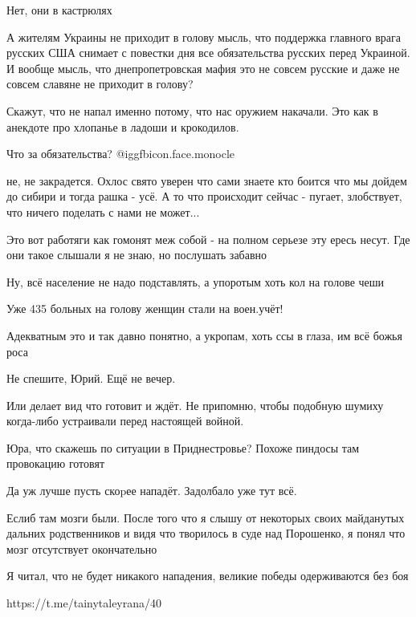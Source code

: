 \begin{multicols}{2}
Нет, они в кастрюлях


А жителям Украины не приходит в голову мысль, что поддержка главного врага
русских США снимает с повестки дня все обязательства русских перед Украиной. И
вообще мысль, что днепропетровская мафия это не совсем русские и даже не совсем
славяне не приходит в голову?


Скажут, что не напал именно потому, что нас оружием накачали. Это как в
анекдоте про хлопанье в ладоши и крокодилов.


Что за обязательства?  @igg{fbicon.face.monocle} 


не, не закрадется. Охлос свято уверен что сами знаете кто боится что мы дойдем
до сибири и тогда рашка - усё. А то что происходит сейчас - пугает, злобствует,
что ничего поделать с нами не может... 

Это вот работяги как гомонят меж собой - на полном серьезе эту ересь несут. Где
они такое слышали я не знаю, но послушать забавно


Ну, всё население не надо подставлять, а упоротым хоть кол на голове чеши


Уже 435 больных на голову женщин стали на воен.учёт!


Адекватным это и так давно понятно, а укропам, хоть ссы в глаза, им всё божья роса


Не спешите, Юрий. Ещё не вечер.


Или делает вид что готовит и ждёт. Не припомню, чтобы подобную шумиху
когда-либо устраивали перед настоящей войной.


Юра, что скажешь по ситуации в Приднестровье? Похоже пиндосы там провокацию готовят


Да уж лучше пусть скоpее нападёт. Задолбало уже тут всё.


Еслиб там мозги были. После того что я слышу от некоторых своих майданутых
дальних родственников и видя что творилось в суде над Порошенко, я понял что
мозг отсутствует окончательно


Я читал, что не будет никакого нападения, великие победы одерживаются без боя

https://t.me/tainytaleyrana/40

\end{multicols} %
